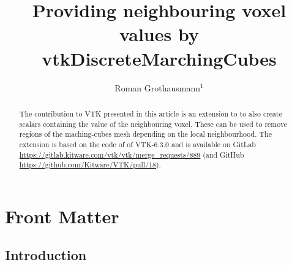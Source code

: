 \documentclass{InsightArticle}
\title{Providing neighbouring voxel values by vtkDiscreteMarchingCubes}
\author{Roman Grothausmann$^{1}$}
\newcommand{\IJhandlerIDnumber}{xxxx}
\begin{document}
%
%
\IJhandlefooter{\IJhandlerIDnumber}


\ifpdf
\else
\fi


\maketitle


\ifhtml
\chapter*{Front Matter\label{front}}
\fi


\begin{abstract}
\noindent
The contribution to VTK presented in this article is an extension to  to also create  scalars containing the value of the neighbouring voxel. These can be used to remove regions of the maching-cubes\citep{Lorensen1987} mesh depending on the local neighbourhood.
The extension is based on the code of  of VTK-6.3.0 and is available on GitLab \url{https://gitlab.kitware.com/vtk/vtk/merge_requests/889} (and GitHub \url{https://github.com/Kitware/VTK/pull/18}).
\end{abstract}

\IJhandlenote{\IJhandlerIDnumber}

\tableofcontents

\pagebreak

\section{Introduction}
\end{document}
